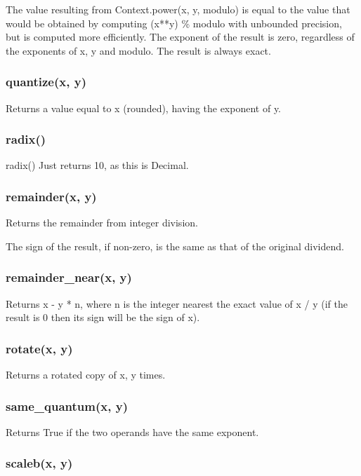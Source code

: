 The value resulting from Context.power(x, y, modulo) is equal to the value that would be obtained by computing (x**y) \% modulo with unbounded precision, but is computed more efficiently. The exponent of the result is zero, regardless of the exponents of x, y and modulo. The result is always exact.

\subsubsection{quantize(x, y)}

Returns a value equal to x (rounded), having the exponent of y.

\subsubsection{radix()}
radix()
Just returns 10, as this is Decimal.

\subsubsection{remainder(x, y)}

Returns the remainder from integer division.

The sign of the result, if non-zero, is the same as that of the original dividend.

\subsubsection{remainder\_near(x, y)}

Returns x - y * n, where n is the integer nearest the exact value of x / y (if the result is 0 then its sign will be the sign of x).

\subsubsection{rotate(x, y)}

Returns a rotated copy of x, y times.

\subsubsection{same\_quantum(x, y)}

Returns True if the two operands have the same exponent.

\subsubsection{scaleb(x, y)}

